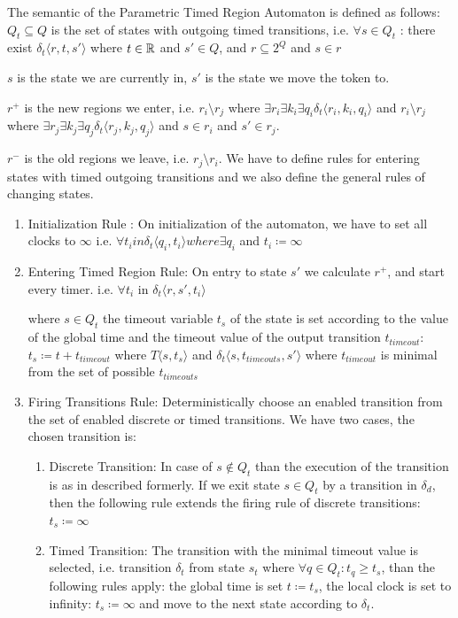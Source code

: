 			The semantic of the Parametric Timed Region Automaton is defined as follows:
			$Q_t \subseteq Q$ is the set of states with outgoing timed transitions, i.e. $\forall s \in Q_t$ : there exist $ \delta_t\langle r, t, s' \rangle$ where $t \in \mathbb{R}$ and $s' \in Q$, and $r \subseteq 2^Q$ and $s \in r$
			
			$s$ is the state we are currently in, $s'$ is the state we move the token to.
			
			$r^+$ is the new regions we enter, i.e. $ r_i \setminus r_j $ where $ \exists r_i \exists k_i \exists q_i \delta_t\langle r_i,k_i,q_i \rangle$ and $ r_i \setminus r_j $ where $ \exists r_j \exists k_j \exists q_j \delta_t\langle r_j,k_j,q_j \rangle$ and $ s \in r_i$ and $s' \in r_j$.
			
			$r^-$ is the old regions we leave, i.e. $ r_j \setminus r_i $.
			We have to define rules for entering states with timed outgoing transitions and we also define the general rules of changing states. 
			\begin{enumerate}
				\item Initialization Rule : On initialization of the automaton, we have to set all clocks to $\infty$ 
					i.e. $\forall t_i in \delta_t \langle q_i, t_i \rangle where \exists q_i$ and $t_i \coloneqq \infty $
			
				\item Entering Timed Region Rule: On entry to state $s'$ we calculate $r^+$, and start every timer.
					i.e. $\forall t_i$ in $\delta_t\langle r, s', t_i \rangle$  
				
				
					where $s \in Q_t$ the timeout variable $t_s$ of the state is set according to the value of the global time and the timeout value of the output transition $t_{timeout}$:
					$t_s\coloneqq t+t_{timeout}$ %
					where $T\langle s,t_s \rangle$ and $\delta_t\langle s,t_{timeouts},s' \rangle$ where $t_{timeout}$ is minimal from the set of possible $t_{timeouts}$ 
				
				\item Firing Transitions Rule: Deterministically choose an enabled transition from the set of enabled discrete or timed transitions. We have two cases, the chosen transition is:
					\begin{enumerate}
						\item Discrete Transition: In case of $s \notin Q_t$ than the execution of the transition is as in described formerly. If we exit state $s \in Q_t$ by a transition in $\delta_d$, 
						then the following rule extends the firing rule of discrete transitions:
							$t_s \coloneqq \infty$
						\item Timed Transition: The transition with the minimal timeout value is selected, i.e. transition $\delta_t$ from state $s_t$ where $\forall q \in Q_t: t_q \geq t_s$, than the following rules apply:
						 the global time is set $t \coloneqq t_s$, the local clock is set to infinity: $t_s \coloneqq \infty$ and move to the next state according to $\delta_t$.
					\end{enumerate}			
			\end{enumerate}
			
